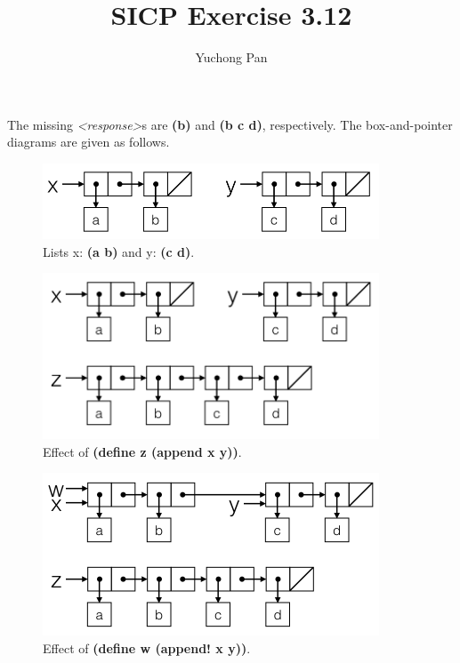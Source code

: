 \documentclass[11pt, oneside]{article}
\title{SICP Exercise 3.12}
\author{Yuchong Pan}
\begin{document}
\maketitle

The missing \emph{<response>}s are \textbf{(b)} and \textbf{(b c d)}, respectively. The box-and-pointer diagrams are given as follows.

\begin{figure}[h!]
    \centering\includegraphics[width=10cm]{ex-3.12-1.png}
    \caption{Lists x: \textbf{(a b)} and y: \textbf{(c d)}.}
\end{figure}

\begin{figure}[h!]
    \centering\includegraphics[width=10cm]{ex-3.12-2.png}
    \caption{Effect of \textbf{(define z (append x y))}.}
\end{figure}

\begin{figure}[h!]
    \centering\includegraphics[width=10cm]{ex-3.12-3.png}
    \caption{Effect of \textbf{(define w (append! x y))}.}
\end{figure}
\end{document}
